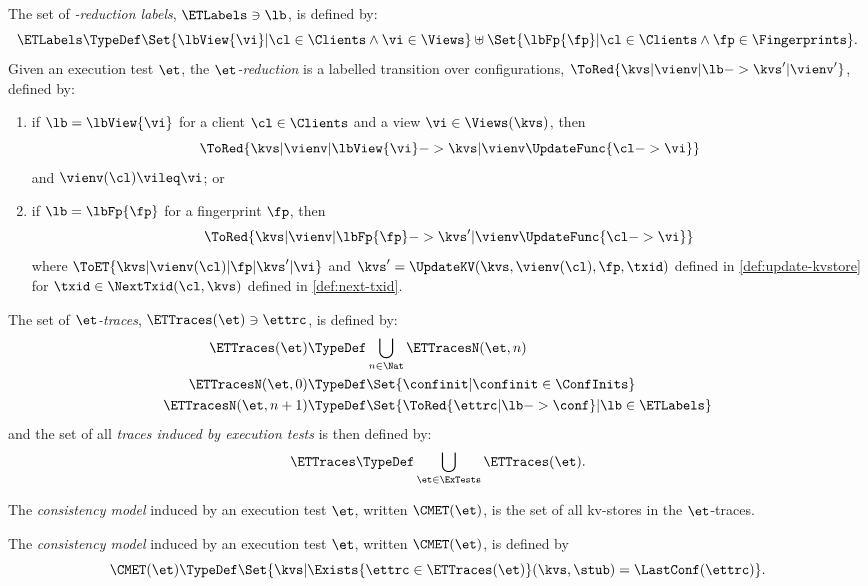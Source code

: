 \begin{definition}
\label{def:et-reduction}
The set of \emph{\et-reduction labels}, \( \ETLabels \ni \lb\), is defined by:
\[
 \ETLabels \TypeDef \Set{\lbView{\vi} | \cl \in \Clients \land \vi \in \Views } 
    \uplus \Set{\lbFp{\fp} | \cl \in \Clients \land \fp \in \Fingerprints} .
\]
Given an execution test \( \et \),
the \emph{\(\et\)-reduction} is a labelled transition over configurations, \( \ToRed{\kvs | \vienv | \lb -> \kvs' | \vienv' }\),
defined by:
\begin{enumerate}
\item if \(\lb = \lbView{\vi}\) for a client \( \cl \in \Clients \) and a view \( \vi \in \Views(\kvs) \), then
\[
    \ToRed{ \kvs | \vienv | \lbView{\vi} -> \kvs  | \vienv\UpdateFunc{\cl -> \vi} }
\]
and \( \vienv(\cl) \vileq \vi\); or
\item if \(\lb = \lbFp{\fp}\) for a fingerprint \(\fp\), then
\[
    \ToRed{ \kvs | \vienv | \lbFp{\fp} -> \kvs' |\vienv\UpdateFunc{\cl -> \vi} }
\] 
where \( \ToET{\kvs | \vienv(\cl) | \fp | \kvs'| \vi} \)
and \(\kvs' = \UpdateKV(\kvs,\vienv(\cl),\fp,\txid)\) defined in \cref{def:update-kvstore}
for \(\txid \in \NextTxid(\cl, \kvs)\) defined in \cref{def:next-txid}.
\end{enumerate}
The set of \emph{\(\et\)-traces}, \(\ETTraces(\et) \ni \ettrc \), is defined by:
\begin{align*}
    \ETTraces(\et) & \TypeDef \bigcup_{n \in \Nat} \ETTracesN(\et,n)
    \\ \ETTracesN(\et,0) & \TypeDef \Set{ \confinit | \confinit \in \ConfInits} 
    \\ \ETTracesN(\et,n+1) & \TypeDef \Set{ \ToRed { \ettrc | \lb -> \conf } | \lb \in \ETLabels } 
\end{align*}
and the set of all \emph{traces induced by execution tests} is then defined by:
\[ \ETTraces \TypeDef \bigcup_{\et \in \ExTests} \ETTraces(\et). \]
\end{definition}

The \emph{consistency model} induced by an execution test \(\et\), 
written \(\CMET(\et)\), is the set of all kv-stores in the \(\et\)-traces. 

\begin{definition}
\label{def:consistency-model-et}
The \emph{consistency model} induced by an execution test \(\et\), written \(\CMET(\et)\), is defined by
\[
\CMET(\et) \TypeDef 
    \Set{\kvs | \Exists{\ettrc \in \ETTraces(\et)} (\kvs,\stub) = \LastConf(\ettrc) } .
\]
\end{definition}

